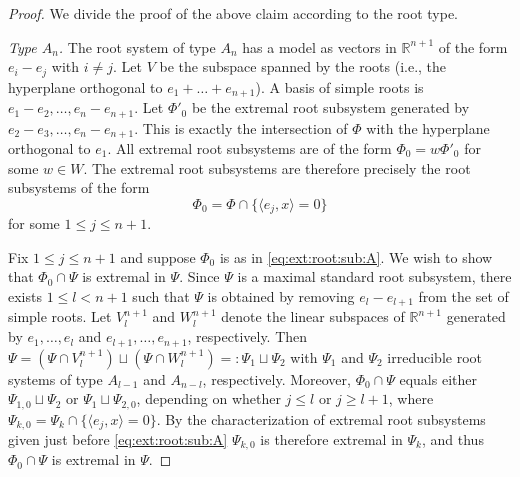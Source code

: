 \documentclass[10pt,a4paper]{amsart}
\begin{document}
\begin{proof}
We divide the proof of the above claim according to the root type.

\medskip

\noindent \textit{Type $A_n$.} The root system of type $A_n$ has a model as vectors in $\mathbb{R}^{n+1}$ of the form $e_i - e_j$ with $i \neq j$. Let $V$ be the subspace spanned by the roots (i.e., the hyperplane orthogonal to $e_1 + \dots + e_{n+1}$). A basis of simple roots is $e_1 - e_2, \dots, e_{n} - e_{n+1}$. Let $\Phi'_0$ be the extremal root subsystem generated by $e_2 - e_3, \dots, e_n - e_{n+1}$. This is exactly the intersection of $\Phi$ with the hyperplane orthogonal to $e_1$. All extremal root subsystems are of the form $\Phi_0=w \Phi'_0$ for some $w\in W$. The extremal root subsystems are therefore precisely the root subsystems of the form
\begin{equation}\label{eq:ext:root:sub:A}
\Phi_0 =\Phi\cap \{\langle e_j, x \rangle = 0\}
\end{equation} 
for some $1\leq j\leq n+1$.

Fix $1\leq j\leq n+1$ and suppose $\Phi_0$ is as in \eqref{eq:ext:root:sub:A}.
    We wish to show that $\Phi_0\cap \Psi$ is extremal in $\Psi$. Since $\Psi$ is a maximal standard root subsystem, there exists $1\leq l<n+1$ such that $\Psi$ is obtained by removing $e_l-e_{l+1}$ from the set of simple roots. 
    Let $V^{n+1}_l$ and $W^{n+1}_l$ denote the linear subspaces of $\mathbb{R}^{n+1}$ generated by $e_1,\ldots, e_l$ and $e_{l+1},\ldots,e_{n+1}$, respectively. Then $\Psi=(\Psi\cap V^{n+1}_l) \sqcup (\Psi\cap W^{n+1}_l)=:\Psi_1\sqcup\Psi_2$ with  $\Psi_1$ and $\Psi_2$ irreducible root systems of type $A_{l-1}$ and $A_{n-l}$, respectively. Moreover, $\Phi_0\cap \Psi$ equals either $\Psi_{1,0}\sqcup\Psi_2$ or $\Psi_1\sqcup \Psi_{2,0}$, depending on whether $j\le l$ or $j\ge l+1$, where $\Psi_{k,0}=\Psi_k\cap \{\langle e_j, x \rangle = 0\}$. By the characterization of extremal root subsystems given just before \eqref{eq:ext:root:sub:A} $\Psi_{k,0}$ is therefore extremal in $\Psi_k$, and thus $\Phi_0\cap \Psi$ is extremal in $\Psi$.
    

\end{proof}
\end{document}
